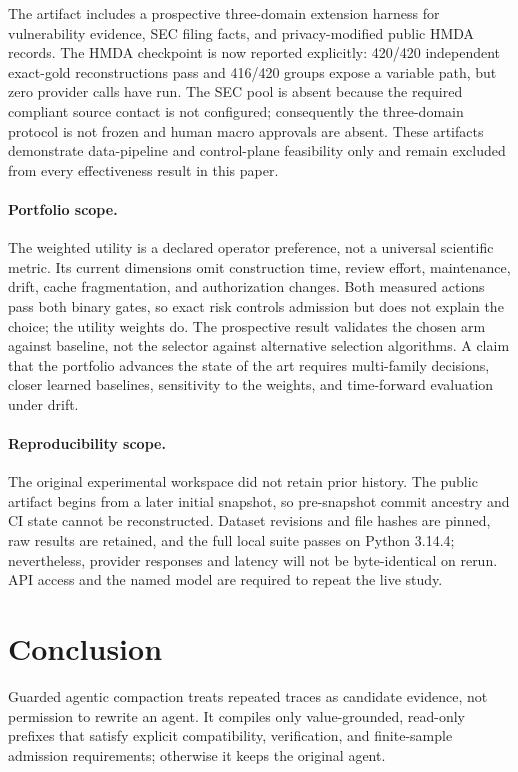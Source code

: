 The artifact includes a prospective three-domain extension harness for vulnerability
evidence, SEC filing facts, and privacy-modified public HMDA records.  The HMDA checkpoint
is now reported explicitly: 420/420 independent exact-gold reconstructions pass and
416/420 groups expose a variable path, but zero provider calls have run.  The SEC pool is
absent because the required compliant source contact is not configured; consequently the
three-domain protocol is not frozen and human macro approvals are absent.  These artifacts
demonstrate data-pipeline and control-plane feasibility only and remain excluded from
every effectiveness result in this paper.

\paragraph{Portfolio scope.}
The weighted utility is a declared operator preference, not a universal scientific metric.
Its current dimensions omit construction time, review effort, maintenance, drift, cache
fragmentation, and authorization changes.  Both measured actions pass both binary gates,
so exact risk controls admission but does not explain the choice; the utility weights do.
The prospective result validates the chosen arm against baseline, not the selector against
alternative selection algorithms.  A claim that the portfolio advances the state of the
art requires multi-family decisions, closer learned baselines, sensitivity to the weights,
and time-forward evaluation under drift.

\paragraph{Reproducibility scope.}
The original experimental workspace did not retain prior  history.  The public
artifact begins from a later initial snapshot, so pre-snapshot commit ancestry and CI state
cannot be reconstructed.  Dataset revisions and file hashes are pinned, raw results are
retained, and the full local suite passes on Python 3.14.4; nevertheless,
provider responses and latency will not be byte-identical on rerun.  API access and the
named model are required to repeat the live study.

\section{Conclusion}

Guarded agentic compaction treats repeated traces as candidate evidence, not permission to
rewrite an agent. It compiles only value-grounded, read-only prefixes that satisfy explicit
compatibility, verification, and finite-sample admission requirements; otherwise it keeps
the original agent.

